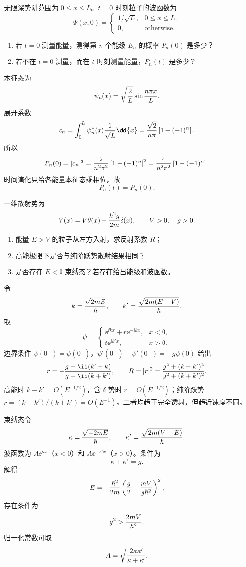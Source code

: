 \begin{question}
无限深势阱范围为 $0\le x\le L$。$t=0$ 时刻粒子的波函数为
\[
\Psi(x,0)=\begin{cases}1/\sqrt L,&0\le x\le L,\\0,&\text{otherwise}.
\end{cases}
\]
\begin{enumerate}
  \item 若 $t=0$ 测量能量，测得第 $n$ 个能级 $E_n$ 的概率 $P_n(0)$ 是多少？
  \item 若不在 $t=0$ 测量，而在 $t$ 时刻测量能量，$P_n(t)$ 是多少？
\end{enumerate}
\begin{solution}
本征态为
\[
  \psi_n(x)=\sqrt{2\over L}\sin {n\pi x\over L}.
\]
展开系数
\[
  c_n=\int_0^L\psi_n^*(x){1\over\sqrt L}\dd{x}
  ={\sqrt2\over n\pi}\left[1-(-1)^n\right].
\]
所以
\[
  P_n(0)=|c_n|^2={2\over n^2\pi^2}\left[1-(-1)^n\right]^2
  ={4\over n^2\pi^2}\left[1-(-1)^n\right].
\]
时间演化只给各能量本征态乘相位，故
\[
  P_n(t)=P_n(0).
\]
\end{solution}
\end{question}

\begin{question}
一维散射势为
\[
  V(x)=V\theta(x)-{\hbar^2g\over2m}\delta(x),\qquad V>0,
  \quad g>0.
\]
\begin{enumerate}
  \item 能量 $E>V$ 的粒子从左方入射，求反射系数 $R$；
  \item 高能极限下是否与纯阶跃势散射结果相同？
  \item 是否存在 $E<0$ 束缚态？若存在给出能级和波函数。
\end{enumerate}
\begin{solution}
令
\[
  k={\sqrt{2mE}\over\hbar},\qquad k'={\sqrt{2m(E-V)}\over\hbar}.
\]
取
\[
\psi=\begin{cases}\ee^{\ii kx}+r\ee^{-\ii kx},&x<0,\\ t\ee^{\ii k'x},&x>0.
\end{cases}
\]
边界条件 $\psi(0^-)=\psi(0^+)$，$\psi'(0^+)-\psi'(0^-)=-g\psi(0)$ 给出
\[
  r=-{g+\ii(k'-k)\over g+\ii(k+k')},
  \qquad
  R=|r|^2={g^2+(k-k')^2\over g^2+(k+k')^2}.
\]
高能时 $k-k'=O(E^{-1/2})$，含 $\delta$ 势时 $r=O(E^{-1/2})$；纯阶跃势 $r=(k-k')/(k+k')=O(E^{-1})$。二者均趋于完全透射，但趋近速度不同。

束缚态令
\[
  \kappa={\sqrt{-2mE}\over\hbar},
  \qquad \kappa'={\sqrt{2m(V-E)}\over\hbar}.
\]
波函数为 $A\ee^{\kappa x}$（$x<0$）和 $A\ee^{-\kappa'x}$（$x>0$）。条件为
\[
  \kappa+\kappa'=g.
\]
解得
\[
  E=-{\hbar^2\over2m}\left({g\over2}-{mV\over g\hbar^2}\right)^2,
\]
存在条件为
\[
  g^2>{2mV\over\hbar^2}.
\]
归一化常数可取
\[
  A=\sqrt{2\kappa\kappa'\over\kappa+\kappa'}.
\]
\end{solution}
\end{question}

